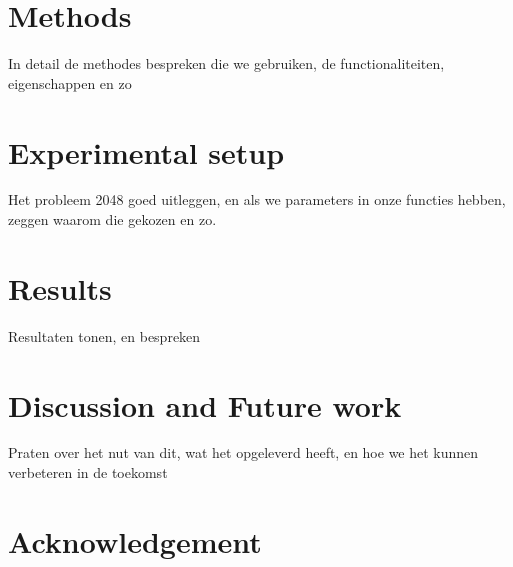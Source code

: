 \documentclass[a4paper,12pt]{article}
\begin{document}
\section{Methods}
In detail de methodes bespreken die we gebruiken, de functionaliteiten, eigenschappen en zo
\section{Experimental setup}
Het probleem 2048 goed uitleggen, en als we parameters in onze functies hebben, zeggen waarom die gekozen en zo.
\section{Results}
Resultaten tonen, en bespreken
\section{Discussion and Future work}
Praten over het nut van dit, wat het opgeleverd heeft, en hoe we het kunnen verbeteren in de toekomst
\section{Acknowledgement}



\end{document}
